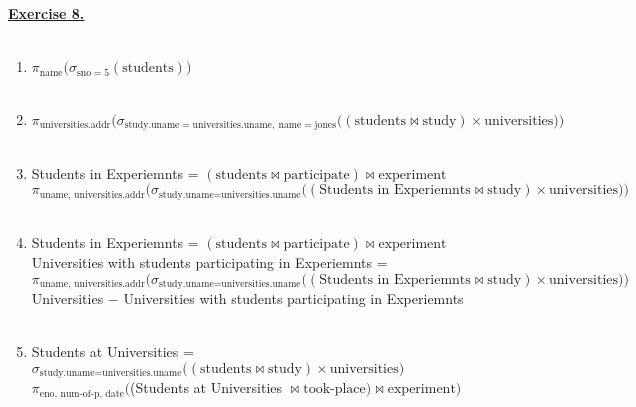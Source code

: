 \documentclass[12pt]{article}
\newcommand{\bigbracket}[1]{\big(#1\big)}
\newcommand{\Bigbracket}[1]{\Big(#1\Big)}
\begin{document}
\newpage
\noindent \hyperlink{toc}{\hypertarget{8}{\LARGE \underline{\textbf{Exercise 8.}}}}\\\\
\begin{enumerate}
    \item $\pi_{\text{name}}\bigbracket{\sigma_{\text{sno}=5}(\text{students})}$\\\\
    \item $\pi_{\text{universities.addr}}\Bigbracket{\sigma_{\text{study.uname}=\text{universities.uname},\ \text{name}=\text{jones}}\bigbracket{(\text{students} \Join \text{study}) \times \text{universities}}}$\\\\
    \item Students in Experiemnts = $(\text{students} \Join \text{participate}) \Join \text{experiment}$\\
          $\pi_{\text{uname, universities.addr}}\Big(\sigma_{\text{study.uname}=\text{universities.uname}} \big((\text{Students in Experiemnts}\Join \text{study})\times \text{universities}\big)\Big)$\\\\
    \item Students in Experiemnts = $(\text{students} \Join \text{participate}) \Join \text{experiment}$\\
          Universities with students participating in Experiemnts =\\
          $\pi_{\text{uname, universities.addr}}\Big(\sigma_{\text{study.uname}=\text{universities.uname}} \big((\text{Students in Experiemnts}\Join \text{study})\times \text{universities}\big)\Big)$\\
          Universities $-$ Universities with students participating in Experiemnts\\\\

    \item Students at Universities = $\sigma_{\text{study.uname}=\text{universities.uname}}\bigbracket{(\text{students} \Join \text{study}) \times \text{universities}}$\\
          $\pi_{\text{eno, num-of-p, date}}\big($(Students at Universities $ \Join \text{took-place}) \Join \text{experiment}\big)$
\end{enumerate}
\end{document}
